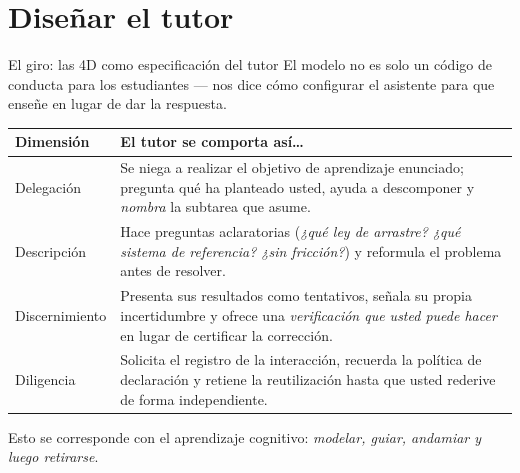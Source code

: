 \documentclass[aspectratio=169,11pt]{beamer}
\begin{document}
\section{Diseñar el tutor}

\begin{frame}[shrink=25]{El giro: las 4D como especificación del tutor}
  El modelo no es solo un código de conducta para los estudiantes --- nos dice
  \alert{cómo configurar el asistente para que enseñe en lugar de dar la respuesta}.
  \vspace{0.6em}
  \renewcommand{\arraystretch}{1.35}
  \footnotesize
  \begin{tabular}{@{}p{2.6cm}p{9.4cm}@{}}
    \toprule
    \textbf{Dimensión} & \textbf{El tutor se comporta así\ldots}\\
    \midrule
    \textcolor{Cdel}{Delegación} & Se niega a realizar el objetivo de aprendizaje
      enunciado; pregunta qué ha planteado usted, ayuda a descomponer y \emph{nombra} la
      subtarea que asume.\\
    \textcolor{Cdes}{Descripción} & Hace preguntas aclaratorias (\emph{¿qué ley de
      arrastre? ¿qué sistema de referencia? ¿sin fricción?}) y reformula el problema antes
      de resolver.\\
    \textcolor{Cdis}{Discernimiento} & Presenta sus resultados como tentativos, señala su
      propia incertidumbre y ofrece una \emph{verificación que usted puede hacer} en lugar
      de certificar la corrección.\\
    \textcolor{Cdil}{Diligencia} & Solicita el registro de la interacción, recuerda la
      política de declaración y retiene la reutilización hasta que usted rederive de forma
      independiente.\\
    \bottomrule
  \end{tabular}
  \vspace{0.5em}

  \scriptsize Esto se corresponde con el aprendizaje cognitivo: \emph{modelar, guiar,
  andamiar y luego retirarse}.
\end{frame}
\end{document}
